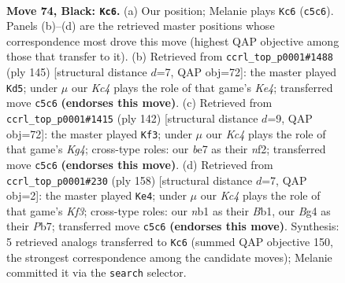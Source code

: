 \documentclass[11pt]{article}
\begin{document}
\clearpage

\begin{figure}[p]\centering
\begin{subfigure}{0.46\textwidth}\centering
\resizebox{\linewidth}{!}{%
\newchessgame
\chessboard[
  setfen={8/4B3/8/2k5/p1p3b1/8/5K2/1N6 b - - 3 74},
  showmover=false,
  pgfstyle=straightmove, color=movearrow, markmove={c5-c6}
]}
\caption{}
\end{subfigure}\hfill
\begin{subfigure}{0.46\textwidth}\centering
\resizebox{\linewidth}{!}{%
\newchessgame
\chessboard[
  setfen={8/2B5/5p2/4k3/8/3K1b2/1P6/8 b - - 1 73},
  showmover=false,
  pgfstyle=straightmove, color=movearrow, markmove={e5-d5}
]}
\caption{}
\end{subfigure}
\\[4pt]
\begin{subfigure}{0.46\textwidth}\centering
\resizebox{\linewidth}{!}{%
\newchessgame
\chessboard[
  setfen={8/8/5k2/7P/6K1/4P3/5n2/8 w - - 1 72},
  showmover=false,
  pgfstyle=straightmove, color=movearrow, markmove={g4-f3}
]}
\caption{}
\end{subfigure}\hfill
\begin{subfigure}{0.46\textwidth}\centering
\resizebox{\linewidth}{!}{%
\newchessgame
\chessboard[
  setfen={1b6/1P6/5k2/8/6P1/p4K2/8/1B6 w - - 2 80},
  showmover=false,
  pgfstyle=straightmove, color=movearrow, markmove={f3-e4}
]}
\caption{}
\end{subfigure}
\caption{\textbf{Move 74, Black: \texttt{Kc6}.} (a) Our position; Melanie plays \texttt{Kc6} (\texttt{c5c6}). Panels (b)--(d) are the retrieved master positions whose correspondence most drove this move (highest QAP objective among those that transfer to it). (b) Retrieved from \texttt{ccrl\_top\_p0001\#1488} (ply 145) [structural distance $d$=7, QAP obj=72]: the master played \texttt{Kd5}; under $\mu$ our \emph{Kc4} plays the role of that game's \emph{Ke4}; transferred move \texttt{c5c6} \textbf{(endorses this move)}. (c) Retrieved from \texttt{ccrl\_top\_p0001\#1415} (ply 142) [structural distance $d$=9, QAP obj=72]: the master played \texttt{Kf3}; under $\mu$ our \emph{Kc4} plays the role of that game's \emph{Kg4}; cross-type roles: our \emph{b}e7 as their \emph{n}f2; transferred move \texttt{c5c6} \textbf{(endorses this move)}. (d) Retrieved from \texttt{ccrl\_top\_p0001\#230} (ply 158) [structural distance $d$=7, QAP obj=2]: the master played \texttt{Ke4}; under $\mu$ our \emph{Kc4} plays the role of that game's \emph{Kf3}; cross-type roles: our \emph{n}b1 as their \emph{B}b1, our \emph{B}g4 as their \emph{P}b7; transferred move \texttt{c5c6} \textbf{(endorses this move)}. Synthesis: 5 retrieved analogs transferred to \texttt{Kc6} (summed QAP objective 150, the strongest correspondence among the candidate moves); Melanie committed it via the \texttt{search} selector.}
\label{fig:thought-m147}
\end{figure}
\end{document}

